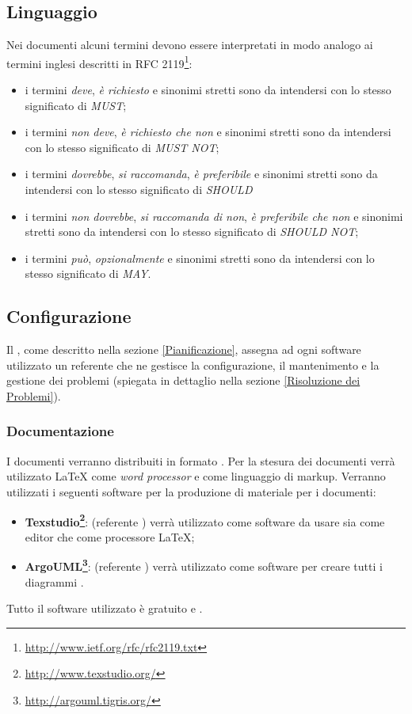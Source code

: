 \documentclass[12pt,a4paper]{article}
\begin{document}
\subsection{Linguaggio}
Nei documenti alcuni termini devono essere interpretati in modo analogo ai termini inglesi descritti in RFC 2119\footnote{\url{http://www.ietf.org/rfc/rfc2119.txt}}:
\begin{itemize}
  \item i termini \emph{deve}, \emph{è richiesto} e sinonimi stretti sono da intendersi con lo stesso significato di \emph{MUST};
  \item i termini \emph{non deve}, \emph{è richiesto che non} e sinonimi stretti sono da intendersi con lo stesso significato di \emph{MUST NOT};
  \item i  termini \emph{dovrebbe}, \emph{si raccomanda}, \emph{è preferibile} e sinonimi stretti sono da intendersi con lo stesso significato di \emph{SHOULD}
  \item i termini \emph{non dovrebbe}, \emph{si raccomanda di non}, \emph{è preferibile che non} e sinonimi stretti sono da intendersi con lo stesso significato di \emph{SHOULD NOT};
  \item i termini \emph{può}, \emph{opzionalmente} e sinonimi stretti sono da intendersi con lo stesso significato di \emph{MAY}.
\end{itemize}

\subsection{Configurazione} %
Il \PM, come descritto nella sezione \ref{Pianificazione}, assegna ad ogni software utilizzato un referente che ne gestisce la configurazione, il mantenimento e la gestione dei problemi (spiegata in dettaglio nella sezione \ref{Risoluzione dei Problemi}).

\subsubsection{Documentazione}
I documenti verranno distribuiti in formato . Per la stesura dei documenti verrà utilizzato \LaTeX{} come \emph{word processor} e come linguaggio di markup. Verranno utilizzati i seguenti software per la produzione di materiale per i documenti:
\begin{itemize}
  \item \textbf{Texstudio\footnote{\url{http://www.texstudio.org/}}}: (referente \NDC) verrà utilizzato come software da usare sia come editor che come processore \LaTeX;
  \item \textbf{ArgoUML\footnote{\url{http://argouml.tigris.org/}}}: (referente \AVE) verrà utilizzato come software per creare tutti i diagrammi .
\end{itemize}
Tutto il software utilizzato è gratuito e \emph{}.
\end{document}
